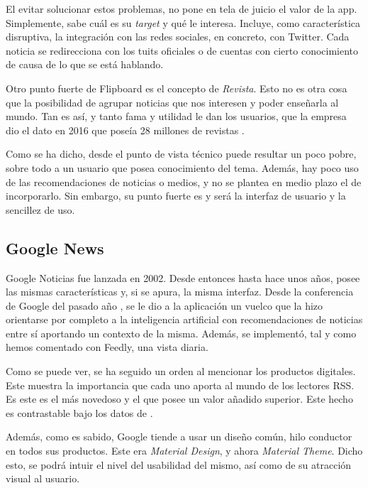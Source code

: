 El evitar solucionar estos problemas, no pone en tela de juicio el valor de la app. Simplemente, sabe cuál es su \textit{target} y qué le interesa. Incluye, como característica disruptiva,  la integración con las redes sociales, en concreto, con Twitter. Cada noticia se redirecciona con los tuits oficiales o de cuentas con cierto conocimiento de causa de lo que se está hablando.

Otro punto fuerte de Flipboard es el concepto de \textit{Revista}. Esto no es otra cosa que la posibilidad de agrupar noticias que nos interesen y poder enseñarla al mundo. Tan es así, y tanto fama y utilidad le dan los usuarios, que la empresa dio el dato en 2016 que poseía 28 millones de revistas .


Como se ha dicho, desde el punto de vista técnico puede resultar un poco pobre, sobre todo a un usuario que posea conocimiento del tema. Además, hay poco uso de las recomendaciones de noticias o medios, y no se plantea en medio plazo el de incorporarlo. Sin embargo, su punto fuerte es y será la interfaz de usuario y la sencillez de uso.

\subsection{Google News}

Google Noticias fue lanzada en 2002. Desde entonces hasta hace unos años, posee las mismas características y, si se apura, la misma interfaz. Desde la conferencia de Google del pasado año , se le dio a la aplicación un vuelco que la hizo orientarse por completo a la inteligencia artificial con recomendaciones de noticias entre sí aportando un contexto de la misma. Además, se implementó, tal y como hemos comentado con Feedly, una vista diaria.

Como se puede ver, se ha seguido un orden al mencionar los productos digitales. Este muestra la importancia que cada uno aporta al mundo de los lectores RSS. Es este es el más novedoso y el que posee un valor añadido superior. Este hecho es contrastable bajo los datos de .


Además, como es sabido, Google tiende a usar un diseño común, hilo conductor en todos sus productos. Este era \textit{Material Design}, y ahora \textit{Material Theme}. Dicho esto, se podrá intuir el nivel del usabilidad del mismo, así como de su atracción visual al usuario.

